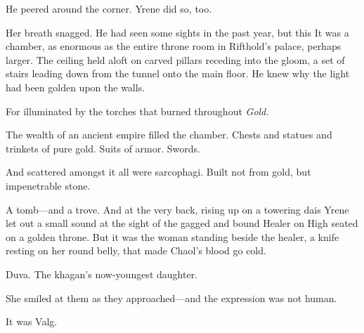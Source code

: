 He peered around the corner.
Yrene did so, too.

Her breath snagged.
He had seen some sights in the past year, but this 
It was a chamber, as enormous as the entire throne room in Rifthold's palace, perhaps larger.
The ceiling held aloft on carved pillars receding into the gloom, a set of stairs leading down from the tunnel onto the main floor.
He knew why the light had been golden upon the walls.

For illuminated by the torches that burned throughout 
\emph{Gold.}

The wealth of an ancient empire filled the chamber.
Chests and statues and trinkets of pure gold.
Suits of armor.
Swords.

And scattered amongst it all were sarcophagi.
Built not from gold, but impenetrable stone.

A tomb---and a trove.
And at the very back, rising up on a towering dais 
Yrene let out a small sound at the sight of the gagged and bound Healer on High seated on a golden throne.
But it was the woman standing beside the healer, a knife resting on her round belly, that made Chaol's blood go cold.

Duva.
The khagan's now-youngest daughter.

She smiled at them as they approached---and the expression was not human.

It was Valg.

